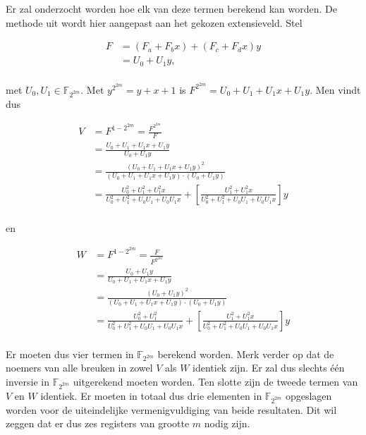 Er zal onderzocht worden hoe elk van deze termen berekend kan worden. De methode uit \cite{beuchat} wordt hier aangepast aan het gekozen extensieveld. Stel

\[\begin{aligned}
F	&= (F_a + F_b x) + (F_c + F_d x)y\\
	&= U_0 + U_1y,\\
\end{aligned}\]

met $U_0, U_1 \in \mathbb{F}_{2^{2m}}$. Met $y^{2^{2m}} = y + x + 1$ is $F^{2^{2m}} = U_0 + U_1 + U_1x + U_1y$. Men vindt dus 

\[\begin{aligned}
V  &= F^{1 - 2^{2m}} = \frac{F^{2^{2m}}}{F}\\
	&= \frac{U_0 + U_1 + U_1x + U_1y}{U_0 + U_1y}\\
	&= \frac{(U_0 + U_1 + U_1x + U_1y)^2}{(U_0 + U_1 + U_1x + U_1y) \cdot (U_0 + U_1y)}\\
	&= \frac{U_0^2 + U_1^2 + U_1^2x}{U_0^2 + U_1^2 + U_0 U_1 + U_0 U_1 x} + \left[\frac{U_1^2 + U_1^2x}{U_0^2 + U_1^2 + U_0 U_1 + U_0 U_1 x}\right]y\\
\end{aligned}\]

en

\[\begin{aligned}
W  &= F^{1 - 2^{2m}} = \frac{F}{F^{2^{2m}}}\\
	&= \frac{U_0 + U_1y}{U_0 + U_1 + U_1x + U_1y}\\
	&= \frac{(U_0 + U_1y)^2}{(U_0 + U_1 + U_1x + U_1y) \cdot (U_0 + U_1y)}\\
	&= \frac{U_0^2 + U_1^2}{U_0^2 + U_1^2 + U_0 U_1 + U_0 U_1 x} + \left[\frac{U_1^2 + U_1^2x}{U_0^2 + U_1^2 + U_0 U_1 + U_0 U_1 x}\right]y\\
\end{aligned}\]

Er moeten dus vier termen in $\mathbb{F}_{2^{2m}}$ berekend worden. Merk verder op dat de noemers van alle breuken in zowel $V$ als $W$ identiek zijn. Er zal dus slechts \'e\'en inversie in $\mathbb{F}_{2^{2m}}$ uitgerekend moeten worden. Ten slotte zijn de tweede termen van $V$ en $W$ identiek. Er moeten in totaal dus drie elementen in $\mathbb{F}_{2^{2m}}$ opgeslagen worden voor de uiteindelijke vermenigvuldiging van beide resultaten. Dit wil zeggen dat er dus zes registers van grootte $m$ nodig zijn.

